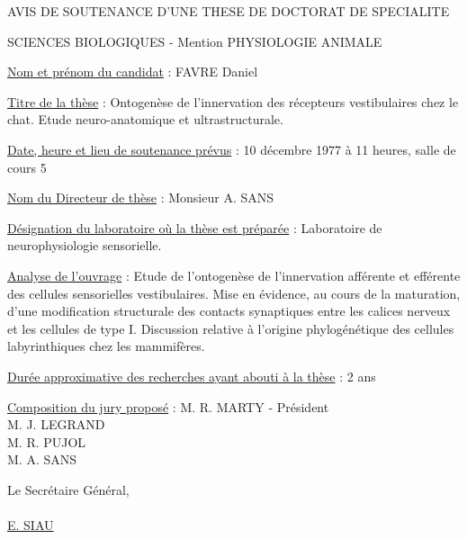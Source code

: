 AVIS DE SOUTENANCE D'UNE THESE DE DOCTORAT DE SPECIALITE

SCIENCES BIOLOGIQUES - Mention PHYSIOLOGIE ANIMALE

\uline{Nom et prénom du candidat} : FAVRE Daniel

\uline{Titre de la thèse} : Ontogenèse de l'innervation des récepteurs vestibulaires chez le chat. Etude neuro-anatomique et ultrastructurale.

\uline{Date, heure et lieu de soutenance prévus} : 10 décembre 1977 à 11 heures, salle de cours 5

\uline{Nom du Directeur de thèse} : Monsieur A. SANS

\uline{Désignation du laboratoire où la thèse est préparée} : Laboratoire de neurophysiologie sensorielle.

\uline{Analyse de l'ouvrage} : Etude de l'ontogenèse de l'innervation afférente et efférente des cellules sensorielles vestibulaires. Mise en évidence, au cours de la maturation, d'une modification structurale des contacts synaptiques entre les calices nerveux et les cellules de type I. Discussion relative à l'origine phylogénétique des cellules labyrinthiques chez les mammifères.

\uline{Durée approximative des recherches ayant abouti à la thèse} : 2 ans

\uline{Composition du jury proposé} : M. R. MARTY - Président\\
M. J. LEGRAND\\
M. R. PUJOL\\
M. A. SANS

Le Secrétaire Général,\\
\\
\uline{E. SIAU}

